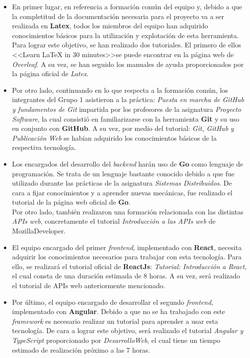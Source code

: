 \documentclass[11pt, a4paper, titlepage]{article}
\begin{document}
\begin{itemize}

\item En primer lugar, en referencia a formación común del equipo y, debido a que la completitud de la documentación necesaria para el proyecto va a ser realizada en \textbf{Latex}, todos los miembros del equipo han adquirido conocimientos básicos para la utilización y explotación de esta herramienta. Para lograr este objetivo, se han realizado dos tutoriales. El primero de ellos <<Learn LaTeX in 30 minutes>>\cite{latextutorial1}se puede encontrar en la página web de \textit{Overleaf}. A su vez, se han seguido los manuales de ayuda proporcionados por la página oficial de \textit{Latex}\cite{latextutorial2}. 

\item Por otro lado, continuando en lo que respecta a la formación común, los integrantes del Grupo 1 asistieron a la práctica: \textit{Puesta en marcha de GitHub y fundamentos de Git} impartida por los profesores de la asignatura \textit{Proyecto Software}, la cual consistió en familiarizarse con la herramienta \textbf{Git} y su uso en conjunto con \textbf{GitHub}. A su vez, por medio del tutorial: \textit{Git, GitHub y Publicación Web}\cite{githubtutorial} se habían adquirido los conocimientos básicos de la respectiva tecnología.

\item Los encargados del desarrollo del \textit{backend} harán uso de \textbf{Go} como lenguaje de programación. Se trata de un lenguaje bastante conocido debido a que fue utilizado durante las prácticas de la asignatura \textit{Sistemas Distribuidos}. De cara a fijar conocimientos y a aprender nuevas mecánicas, fue realizado el tutorial de la página web oficial de \textbf{Go}. \\
Por otro lado, también realizaron una formación relacionada con las distintas \textit{APIs web}, concretamente el tutorial \textit{Introducción a las APIs web} de MozillaDeveloper\cite{apisweb}.

\item El equipo encargado del primer \textit{frontend}, implementado con \textbf{React}, necesita adquirir los conocimientos necesarios para trabajar con esta tecnología. Para ello, se realizará el tutorial oficial de \textbf{ReactJs}: \textit{Tutorial: Introducción a React}\cite{reactjs}, el cual consta de una duración estimada de 8 horas. A su vez, será realizado el tutorial de APIs web anteriormente mencionado\cite{apisweb}.

\item Por último, el equipo encargado de desarrollar el segundo \textit{frontend}, implementado con \textbf{Angular}. Debido a que no se ha trabajado con este \textit{framework} es necesario realizar un tutorial para aprender a usar esta tecnología. De cara a lograr este objetivo, será realizado el tutorial \textit{Angular y TypeScript}\cite{angular} proporcionado por \textit{DesarrolloWeb}, el cual tiene un tiempo estimado de realización próximo a las 7 horas.

\end{itemize}
\end{document}
